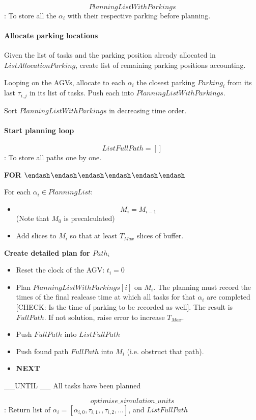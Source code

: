 \documentclass[12pt,a4paper]{article}
\begin{document}
\[
PlanningListWithParkings
\]
: To store all the $\alpha_i$ with their respective parking before planning.

\paragraph{Allocate parking locations}
Given the list of tasks and the parking position already allocated in $ListAllocationParking$, create list of remaining parking positions accounting.

Looping on the AGVs, allocate to each $\alpha_i$ the closest parking $Parking_i$ from its last $\tau_{i, j}$ in its list of tasks. Push each into $PlanningListWithParkings$.

Sort $PlanningListWithParkings$ in decreasing time order.

\paragraph{Start planning loop}
\[
ListFullPath = []
\]
: To store all paths one by one.

\textbf{FOR} \ensuremath{\endash}\ensuremath{\endash}\ensuremath{\endash}\ensuremath{\endash}\ensuremath{\endash}\ensuremath{\endash}

For each $\alpha_i \in PlanningList$:

\begin{itemize}
\item \[
M_i = M_{i-1}
\]
(Note that $M_0$ is precalculated)


\item Add slices to $M_i$ so that at least $T_{Max}$ slices of buffer.

\end{itemize}
\textbf{Create detailed plan for $Path_i$}

\begin{itemize}
\item Reset the clock of the AGV: $t_i = 0$


\item Plan $PlanningListWithParkings[i]$ on $M_i$. The planning must record the times of the final realease time at which all tasks for that $\alpha_i$ are completed [CHECK: Is the time of parking to be recorded as well]. The result is $FullPath$. If not solution, raise error to increase $T_{Max}$.


\item Push $FullPath$ into $ListFullPath$


\item Push found path $FullPath$ into $M_i$ (i.e. obstruct that path).


\item \textbf{NEXT}

\end{itemize}
\_\_UNTIL \_\_ All tasks have been planned

\[
optimise\_simulation\_units
\]
: Return list of $\alpha_i=[\alpha_{i, 0}, \tau_{i, 1}, , \tau_{i, 2}, ...]$, and $ListFullPath$


\begin{lstlisting}

\end{lstlisting}
\end{document}
